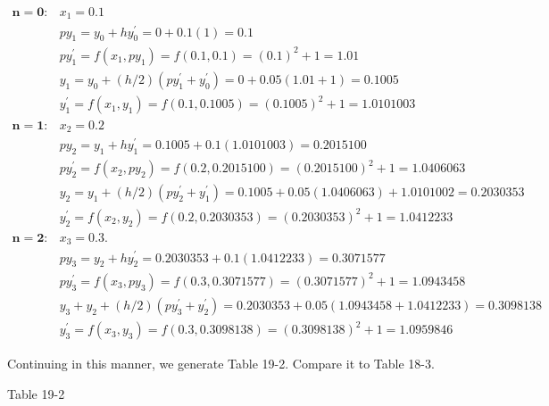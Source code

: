 \documentclass[10pt]{article}
\begin{document}
$$
\begin{array}{ll}
\mathbf{n = 0}: & x_{1}=0.1 \\
& p y_{1}=y_{0}+h y_{0}^{\prime}=0+0.1(1)=0.1 \\
& p y_{1}^{\prime}=f\left(x_{1}, p y_{1}\right)=f(0.1,0.1)=(0.1)^{2}+1=1.01 \\
& y_{1}=y_{0}+(h / 2)\left(p y_{1}^{\prime}+y_{0}^{\prime}\right)=0+0.05(1.01+1)=0.1005 \\
& y_{1}^{\prime}=f\left(x_{1}, y_{1}\right)=f(0.1,0.1005)=(0.1005)^{2}+1=1.0101003 \\
\mathbf{n = 1}: & x_{2}=0.2 \\
& p y_{2}=y_{1}+h y_{1}^{\prime}=0.1005+0.1(1.0101003)=0.2015100 \\
& p y_{2}^{\prime}=f\left(x_{2}, p y_{2}\right)=f(0.2,0.2015100)=(0.2015100)^{2}+1=1.0406063 \\
& y_{2}=y_{1}+(h / 2)\left(p y_{2}^{\prime}+y_{1}^{\prime}\right)=0.1005+0.05(1.0406063)+1.0101002=0.2030353 \\
& y_{2}^{\prime}=f\left(x_{2}, y_{2}\right)=f(0.2,0.2030353)=(0.2030353)^{2}+1=1.0412233 \\
\mathbf{n = 2}: & x_{3}=0.3 . \\
& p y_{3}=y_{2}+h y_{2}^{\prime}=0.2030353+0.1(1.0412233)=0.3071577 \\
& p y_{3}^{\prime}=f\left(x_{3}, p y_{3}\right)=f(0.3,0.3071577)=(0.3071577)^{2}+1=1.0943458 \\
& y_{3}+y_{2}+(h / 2)\left(p y_{3}^{\prime}+y_{2}^{\prime}\right)=0.2030353+0.05(1.0943458+1.0412233)=0.3098138 \\
& y_{3}^{\prime}=f\left(x_{3}, y_{3}\right)=f(0.3,0.3098138)=(0.3098138)^{2}+1=1.0959846
\end{array}
$$

Continuing in this manner, we generate Table 19-2. Compare it to Table 18-3.

Table 19-2
\end{document}
